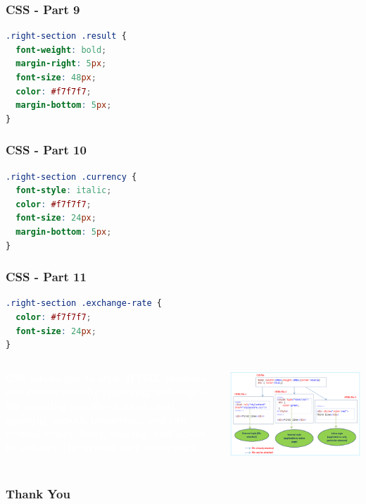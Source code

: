 \documentclass[aspectratio=169, table]{beamer}
\begin{document}
\begin{frame}[fragile]
    \frametitle{CSS - Part 9}
    \begin{lstlisting}[language=CSS]
.right-section .result {
  font-weight: bold;
  margin-right: 5px;
  font-size: 48px;
  color: #f7f7f7;
  margin-bottom: 5px;
}
    \end{lstlisting}
\end{frame}

\begin{frame}[fragile]
    \frametitle{CSS - Part 10}
    \begin{lstlisting}[language=CSS]
.right-section .currency {
  font-style: italic;
  color: #f7f7f7;
  font-size: 24px;
  margin-bottom: 5px;
}
    \end{lstlisting}
\end{frame}

\begin{frame}[fragile]
    \frametitle{CSS - Part 11}
    \begin{lstlisting}[language=CSS]
.right-section .exchange-rate {
  color: #f7f7f7;
  font-size: 24px;
}
    \end{lstlisting}
\end{frame}

\begin{frame3}
    \vskip1cm
    \begin{tcolorbox}[standard jigsaw, opacityback=0, opacityframe=0, sharp corners, boxrule=0pt]
        \begin{columns}[T] %
            \begin{column}{0.5\textwidth}
                \textbf{\textcolor{white}{CSS allows you to style HTML elements and create visually appealing web pages. By selecting specific elements and applying various properties, you can control colors, fonts, spacing, and layout to enhance the overall user experience.}}
            \end{column}
            \begin{column}{0.5\textwidth}
                \includegraphics[width=1\textwidth]{classFiles/css_styling.png}
            \end{column}
        \end{columns}
    \end{tcolorbox}
\end{frame3}

\begin{frame4}
    \frametitle{Thank You}
\end{frame4}
\end{document}
